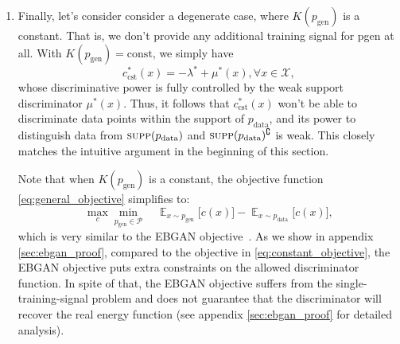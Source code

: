 \documentclass[a4paper]{article}
\newcommand{\article}{paper\xspace}
\newcommand{\pd}{p_\text{data}}
\newcommand{\pg}{p_\text{gen}}
\DeclareMathOperator*{\E}{\mathbb{E}}
\begin{document}
\begin{enumerate}[leftmargin=16pt,labelindent=16pt]
Surprisingly, the result suggests that the optimal discriminator $c_{\ell_2}^*(x)$ directly recovers the negative probability $-\pd(x)$, shifted by a constant.
Thus, similar to the entropy solution \eqref{eq:optimal_disc_entropy}, it fully retains the relative density information of data points within the support.

However, because of the under-determined term $\mu^*(x)$, we cannot recover the distribution density $\pd$ exactly from either $c_{\ell_2}^*$ or $c_\text{ent}^*$ if the data support is finite.
Whether this ambiguity can be resolved is beyond the scope of this \article, but poses an interesting research problem. 



\item Finally, let's consider consider a degenerate case, where $K(\pg)$ is a constant. 
That is, we don’t provide
any additional training signal for pgen at all. With $K(\pg) = \text{const}$, we simply have
\begin{equation}
c_\text{cst}^*(x) = −\lambda^* + \mu^*(x), \forall x \in \mathcal{X}, 
\end{equation}
whose discriminative power is fully controlled by the weak support discriminator $\mu^*(x)$. 
Thus, it follows that $c_\text{cst}^*(x)$ won't be able to discriminate data points within the support of $\pd$, and its power to distinguish data from $\textsc{supp}(\pd)$ and $\textsc{supp}(\pd)^\complement$ is weak.
This closely matches the intuitive argument in the beginning of this section.





Note that when $K(\pg)$ is a constant, the objective function \eqref{eq:general_objective} simplifies to: 
\begin{equation}
\label{eq:constant_objective}
\max_{c} \min_{\pg \in \mathcal{P}} \quad
	\E_{x \sim \pg} \big[ c(x) \big] - 
    \E_{x \sim \pd} \big[ c(x) \big],
\end{equation}
which is very similar to the EBGAN objective~\citep[equation (2) and (4)]{zhao2016energy}.
As we show in appendix \ref{sec:ebgan_proof}, compared to the objective in \eqref{eq:constant_objective}, the EBGAN objective puts extra constraints on the allowed discriminator function.
In spite of that, the EBGAN objective suffers from the single-training-signal problem and does not guarantee that the discriminator will recover the real energy function (see appendix \ref{sec:ebgan_proof} for detailed analysis).
\end{enumerate}
\end{document}
